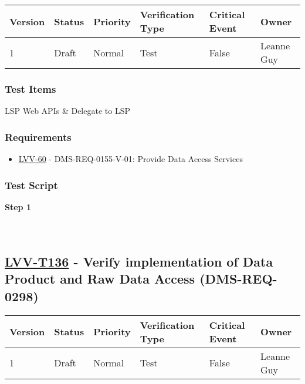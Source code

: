 \begin{longtable}[]{@{}llllll@{}}
\toprule
Version & Status & Priority & Verification Type & Critical Event &
Owner\tabularnewline
\midrule
\endhead
1 & Draft & Normal & Test & False & Leanne Guy\tabularnewline
\bottomrule
\end{longtable}

\hypertarget{test-items-111}{%
\subsubsection{Test Items}\label{test-items-111}}

LSP Web APIs \& Delegate to LSP

\hypertarget{requirements-112}{%
\subsubsection{Requirements}\label{requirements-112}}

\begin{itemize}
\tightlist
\item
  \href{https://jira.lsstcorp.org/browse/LVV-60}{LVV-60} -
  DMS-REQ-0155-V-01: Provide Data Access Services
\end{itemize}

\hypertarget{test-script-112}{%
\subsubsection{Test Script}\label{test-script-112}}

\textbf{Step 1}\\
~\\
~\\

\hypertarget{lvv-t136---verify-implementation-of-data-product-and-raw-data-access-dms-req-0298}{%
\subsection{\texorpdfstring{\href{https://jira.lsstcorp.org/secure/Tests.jspa\#/testCase/LVV-T136}{LVV-T136}
- Verify implementation of Data Product and Raw Data Access
(DMS-REQ-0298)}{LVV-T136 - Verify implementation of Data Product and Raw Data Access (DMS-REQ-0298)}}\label{lvv-t136---verify-implementation-of-data-product-and-raw-data-access-dms-req-0298}}

\begin{longtable}[]{@{}llllll@{}}
\toprule
Version & Status & Priority & Verification Type & Critical Event &
Owner\tabularnewline
\midrule
\endhead
1 & Draft & Normal & Test & False & Leanne Guy\tabularnewline
\bottomrule
\end{longtable}

